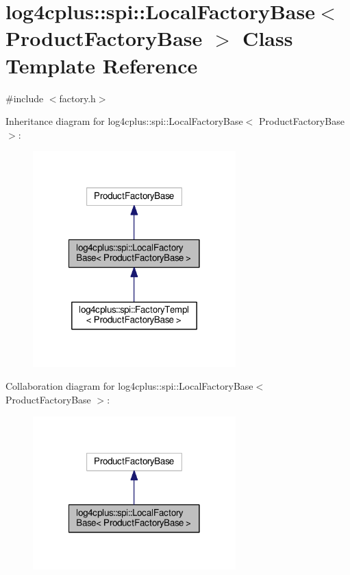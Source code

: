 \hypertarget{classlog4cplus_1_1spi_1_1LocalFactoryBase}{\section{log4cplus\-:\-:spi\-:\-:Local\-Factory\-Base$<$ Product\-Factory\-Base $>$ Class Template Reference}
\label{classlog4cplus_1_1spi_1_1LocalFactoryBase}
}


{\ttfamily \#include $<$factory.\-h$>$}



Inheritance diagram for log4cplus\-:\-:spi\-:\-:Local\-Factory\-Base$<$ Product\-Factory\-Base $>$\-:
\nopagebreak
\begin{figure}[H]
\begin{center}
\leavevmode
\includegraphics[width=222pt]{classlog4cplus_1_1spi_1_1LocalFactoryBase__inherit__graph}
\end{center}
\end{figure}


Collaboration diagram for log4cplus\-:\-:spi\-:\-:Local\-Factory\-Base$<$ Product\-Factory\-Base $>$\-:
\nopagebreak
\begin{figure}[H]
\begin{center}
\leavevmode
\includegraphics[width=222pt]{classlog4cplus_1_1spi_1_1LocalFactoryBase__coll__graph}
\end{center}
\end{figure}
